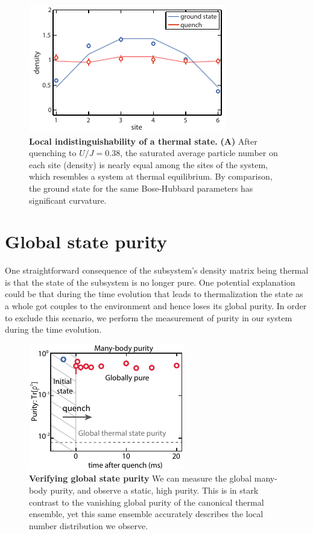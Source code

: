 \begin{figure}[t!]
	\centering
	\includegraphics[scale=1.5]{figures/ETH_density.pdf}
	\caption{{\bf Local indistinguishability of a thermal state.} {\bf(A)} After quenching to $U/J=0.38$, the saturated average particle number on each site (density) is nearly equal among the sites of the system, which resembles a system at thermal equilibrium. By comparison, the ground state for the same Bose-Hubbard parameters has significant curvature.}
	\label{fig:ETH_density}
\end{figure} 

\section{Global state purity}

One straightforward consequence of the subsystem's density matrix being thermal is that the state of the subsystem is no longer pure. One potential explanation could be that during the time evolution that leads to thermalization the state as a whole got couples to the environment and hence loses its global purity. In order to exclude this scenario, we perform the measurement of purity in our system during the time evolution. 

\begin{figure}[h!]
	\centering
	\includegraphics[scale=2]{figures/ETH_purity.pdf}
	\caption{{\bf Verifying global state purity}  We can measure the global many-body purity, and observe a static, high purity. This is in stark contrast to the vanishing global purity of the canonical thermal ensemble, yet this same ensemble accurately describes the local number distribution we observe.
	}
	
	\label{fig:ETH_purity}
\end{figure}  

